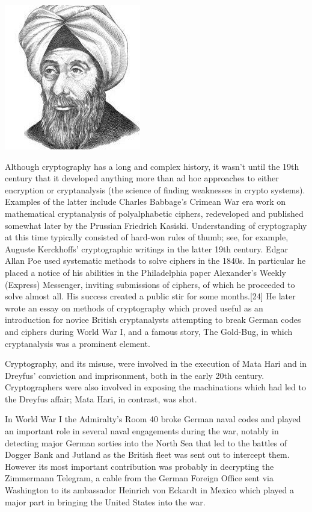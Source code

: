 \documentclass{report}
\begin{document}
{{\begin{center}
\includegraphics[scale=0.6]{"al_kindi.png"}
\end{center}


\Large{Although cryptography has a long and complex history, it wasn't until the 19th century that it developed anything more than ad hoc approaches to either encryption or cryptanalysis (the science of finding weaknesses in crypto systems). Examples of the latter include Charles Babbage's Crimean War era work on mathematical cryptanalysis of polyalphabetic ciphers, redeveloped and published somewhat later by the Prussian Friedrich Kasiski. Understanding of cryptography at this time typically consisted of hard-won rules of thumb; see, for example, Auguste Kerckhoffs' cryptographic writings in the latter 19th century. Edgar Allan Poe used systematic methods to solve ciphers in the 1840s. In particular he placed a notice of his abilities in the Philadelphia paper Alexander's Weekly (Express) Messenger, inviting submissions of ciphers, of which he proceeded to solve almost all. His success created a public stir for some months.[24] He later wrote an essay on methods of cryptography which proved useful as an introduction for novice British cryptanalysts attempting to break German codes and ciphers during World War I, and a famous story, The Gold-Bug, in which cryptanalysis was a prominent element.

Cryptography, and its misuse, were involved in the execution of Mata Hari and in Dreyfus' conviction and imprisonment, both in the early 20th century. Cryptographers were also involved in exposing the machinations which had led to the Dreyfus affair; Mata Hari, in contrast, was shot.

In World War I the Admiralty's Room 40 broke German naval codes and played an important role in several naval engagements during the war, notably in detecting major German sorties into the North Sea that led to the battles of Dogger Bank and Jutland as the British fleet was sent out to intercept them. However its most important contribution was probably in decrypting the Zimmermann Telegram, a cable from the German Foreign Office sent via Washington to its ambassador Heinrich von Eckardt in Mexico which played a major part in bringing the United States into the war.

}}}
\end{document}

